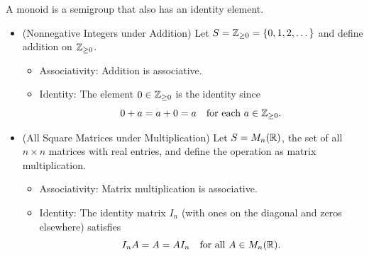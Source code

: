 \documentclass[11pt,openany]{article}
\begin{document}
\begin{example}
A monoid is a semigroup that also has an identity element. \begin{itemize}
	\item (Nonnegative Integers under Addition) Let $S=\mathbb{Z}_{\geq 0}=\set{0,1,2,\dots}$ and define addition on $\mathbb{Z}_{\geq 0}$. \begin{itemize}
		\item Associativity: Addition is associative.
		\item Identity: The element $0\in\mathbb{Z}_{\geq 0}$ is the identity since \[
		0+a=a+0=a\quad \text{for each}\ a\in\mathbb{Z}_{\geq 0}.
		\]
	\end{itemize}
	\item (All Square Matrices under Multiplication) Let $S=M_n(\mathbb{R})$, the set of all $n\times n$ matrices with real entries, and define the operation as matrix multiplication. \begin{itemize}
		\item Associativity: Matrix multiplication is associative.
		\item Identity: The identity matrix $I_n$ (with ones on the diagonal and zeros elsewhere) satisfies \[
		I_nA=A=AI_n\quad\text{for all}\ A\in M_n(\mathbb{R}).
		\]
	\end{itemize}
\end{itemize}
\end{example}
\end{document}
